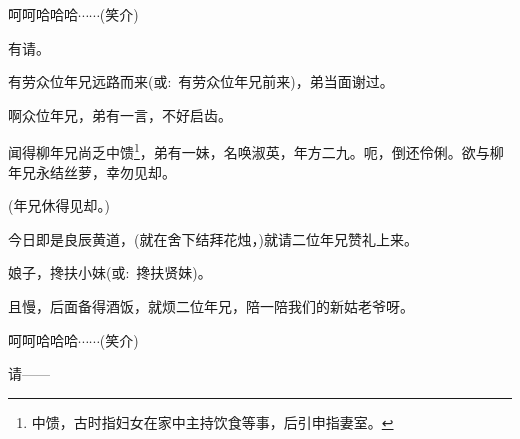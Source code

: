 {


{呵呵哈哈哈$\cdots{}\cdots{}$({\hwfs 笑介})}


{\vspace{5pt}}

{有请。}

{有劳众位年兄远路而来({\akai 或}:~有劳众位年兄前来)，弟当面谢过。}

{啊众位年兄，弟有一言，不好启齿。}

{闻得柳年兄尚乏中馈\footnote{中馈，古时指妇女在家中主持饮食等事，后引申指妻室。}，弟有一妹，名唤淑英，年方二九。呃，倒还伶俐。欲与柳年兄永结丝萝，幸勿见却。}

{(年兄休得见却。)}

{今日即是良辰黄道，(就在舍下结拜花烛，)就请二位年兄赞礼上来。}

{娘子，搀扶小妹({\akai 或}:~搀扶贤妹)。}

{且慢，后面备得酒饭，就烦二位年兄，陪一陪我们的新姑老爷呀。}

{呵呵哈哈哈$\cdots{}\cdots{}$({\hwfs 笑介})}

{请------}

}
